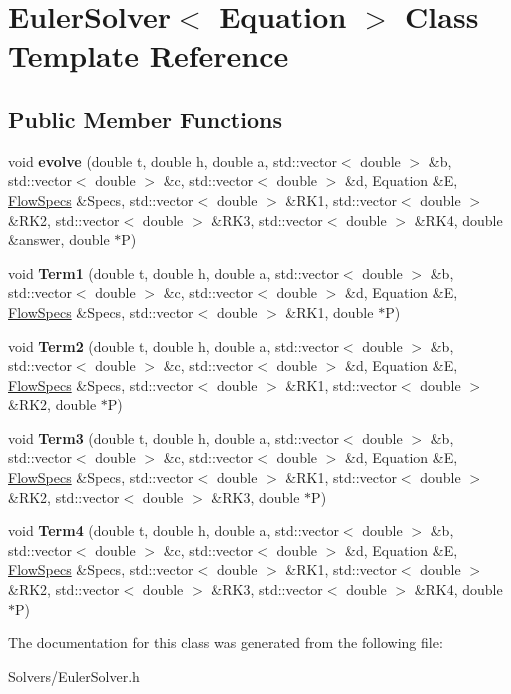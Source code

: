 \hypertarget{classEulerSolver}{}\section{Euler\+Solver$<$ Equation $>$ Class Template Reference}
\label{classEulerSolver}
\subsection*{Public Member Functions}
\begin{DoxyCompactItemize}
\item 
\mbox{\label{classEulerSolver_aa2d39ebf15960d4d6cb6b0b02213e253}} 
void {\bfseries evolve} (double t, double h, double a, std\+::vector$<$ double $>$ \&b, std\+::vector$<$ double $>$ \&c, std\+::vector$<$ double $>$ \&d, Equation \&E, \hyperlink{structFlowSpecs}{Flow\+Specs} \&Specs, std\+::vector$<$ double $>$ \&R\+K1, std\+::vector$<$ double $>$ \&R\+K2, std\+::vector$<$ double $>$ \&R\+K3, std\+::vector$<$ double $>$ \&R\+K4, double \&answer, double $\ast$P)
\item 
\mbox{\label{classEulerSolver_acc7ad686da6a0022b6b765f3819ff14f}} 
void {\bfseries Term1} (double t, double h, double a, std\+::vector$<$ double $>$ \&b, std\+::vector$<$ double $>$ \&c, std\+::vector$<$ double $>$ \&d, Equation \&E, \hyperlink{structFlowSpecs}{Flow\+Specs} \&Specs, std\+::vector$<$ double $>$ \&R\+K1, double $\ast$P)
\item 
\mbox{\label{classEulerSolver_a983fba06c599c0a58348c588555b8f28}} 
void {\bfseries Term2} (double t, double h, double a, std\+::vector$<$ double $>$ \&b, std\+::vector$<$ double $>$ \&c, std\+::vector$<$ double $>$ \&d, Equation \&E, \hyperlink{structFlowSpecs}{Flow\+Specs} \&Specs, std\+::vector$<$ double $>$ \&R\+K1, std\+::vector$<$ double $>$ \&R\+K2, double $\ast$P)
\item 
\mbox{\label{classEulerSolver_a2cead92011bfba627c84294652bc50bc}} 
void {\bfseries Term3} (double t, double h, double a, std\+::vector$<$ double $>$ \&b, std\+::vector$<$ double $>$ \&c, std\+::vector$<$ double $>$ \&d, Equation \&E, \hyperlink{structFlowSpecs}{Flow\+Specs} \&Specs, std\+::vector$<$ double $>$ \&R\+K1, std\+::vector$<$ double $>$ \&R\+K2, std\+::vector$<$ double $>$ \&R\+K3, double $\ast$P)
\item 
\mbox{\label{classEulerSolver_a5d0977e97c90e60e407f611c76459082}} 
void {\bfseries Term4} (double t, double h, double a, std\+::vector$<$ double $>$ \&b, std\+::vector$<$ double $>$ \&c, std\+::vector$<$ double $>$ \&d, Equation \&E, \hyperlink{structFlowSpecs}{Flow\+Specs} \&Specs, std\+::vector$<$ double $>$ \&R\+K1, std\+::vector$<$ double $>$ \&R\+K2, std\+::vector$<$ double $>$ \&R\+K3, std\+::vector$<$ double $>$ \&R\+K4, double $\ast$P)
\end{DoxyCompactItemize}


The documentation for this class was generated from the following file\+:\begin{DoxyCompactItemize}
\item 
Solvers/Euler\+Solver.\+h\end{DoxyCompactItemize}
